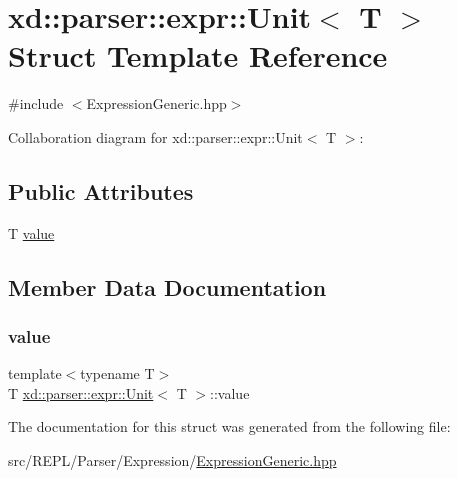 \hypertarget{structxd_1_1parser_1_1expr_1_1_unit}{}\section{xd\+:\+:parser\+:\+:expr\+:\+:Unit$<$ T $>$ Struct Template Reference}
\label{structxd_1_1parser_1_1expr_1_1_unit}


{\ttfamily \#include $<$Expression\+Generic.\+hpp$>$}



Collaboration diagram for xd\+:\+:parser\+:\+:expr\+:\+:Unit$<$ T $>$\+:
\subsection*{Public Attributes}
\begin{DoxyCompactItemize}
\item 
T \mbox{\hyperlink{structxd_1_1parser_1_1expr_1_1_unit_afff808d79a7c154164e6d4f371458792}{value}}
\end{DoxyCompactItemize}


\subsection{Member Data Documentation}
\mbox{\label{structxd_1_1parser_1_1expr_1_1_unit_afff808d79a7c154164e6d4f371458792}} 
\subsubsection{\texorpdfstring{value}{value}}
{\footnotesize\ttfamily template$<$typename T$>$ \\
T \mbox{\hyperlink{structxd_1_1parser_1_1expr_1_1_unit}{xd\+::parser\+::expr\+::\+Unit}}$<$ T $>$\+::value}



The documentation for this struct was generated from the following file\+:\begin{DoxyCompactItemize}
\item 
src/\+R\+E\+P\+L/\+Parser/\+Expression/\mbox{\hyperlink{_expression_generic_8hpp}{Expression\+Generic.\+hpp}}\end{DoxyCompactItemize}
